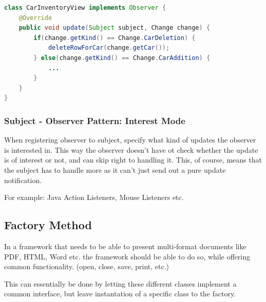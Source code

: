 \documentclass[
    ../../Software_Engineering_Summary.tex,
]
{subfiles}
\begin{document}
\begin{codebox}
    \begin{lstlisting}[language=Java]
class CarInventoryView implements Observer {
    @Override
    public void update(Subject subject, Change change) {
        if(change.getKind() == Change.CarDeletion) {
            deleteRowForCar(change.getCar());
        } else(change.getKind() == Change.CarAddition) {
            ...                    
        }
    }
}\end{lstlisting}
\end{codebox}

\subsubsection{Subject - Observer Pattern: Interest Mode}

When registering observer to subject, specify what kind of updates the observer is interested in. This way the observer doesn't have ot check whether the update is of interest or not, and can skip right to handling it. This, of course, means that the subject has to handle more as it can't just send out a pure update notification.

For example: Java Action Listeners, Mouse Listeners etc.

\subsection{Factory Method}

In a framework that needs to be able to present multi-format documents like PDF, HTML, Word etc. the framework should be able to do so, while offering common functionality. (open, close, save, print, etc.) 

This can essentially be done by letting these different classes implement a common interface, but leave instantation of a specific class to the factory.
\end{document}
